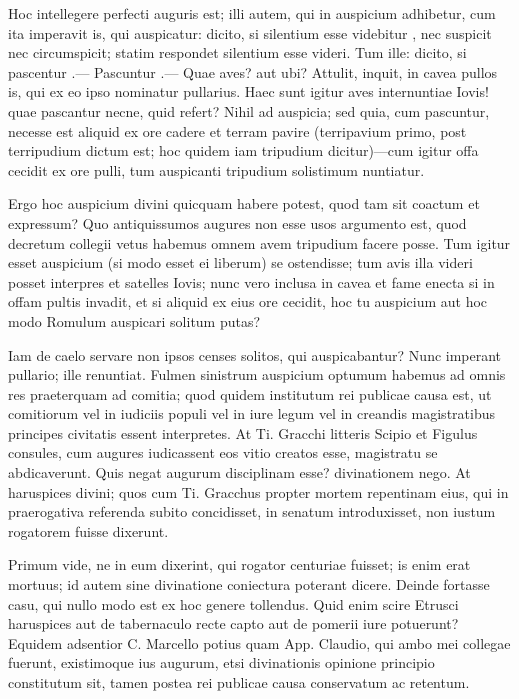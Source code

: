  Hoc intellegere perfecti auguris est; illi autem, qui in auspicium adhibetur, cum ita imperavit is, qui auspicatur: dicito, si silentium esse videbitur , nec suspicit nec circumspicit; statim respondet silentium esse videri. Tum ille: dicito, si pascentur .— Pascuntur .— Quae aves? aut ubi? Attulit, inquit, in cavea pullos is, qui ex eo ipso nominatur pullarius. Haec sunt igitur aves internuntiae Iovis! quae pascantur necne, quid refert? Nihil ad auspicia; sed quia, cum pascuntur, necesse est aliquid ex ore cadere et terram pavire (terripavium primo, post terripudium dictum est; hoc quidem iam tripudium dicitur)—cum igitur offa cecidit ex ore pulli, tum auspicanti tripudium solistimum nuntiatur.

 Ergo hoc auspicium divini quicquam habere potest, quod tam sit coactum et expressum? Quo antiquissumos augures non esse usos argumento est, quod decretum collegii vetus habemus omnem avem tripudium facere posse. Tum igitur esset auspicium (si modo esset ei liberum) se ostendisse; tum avis illa videri posset interpres et satelles Iovis; nunc vero inclusa in cavea et fame enecta si in offam pultis invadit, et si aliquid ex eius ore cecidit, hoc tu auspicium aut hoc modo Romulum auspicari solitum putas?

 Iam de caelo servare non ipsos censes solitos, qui auspicabantur? Nunc imperant pullario; ille renuntiat. Fulmen sinistrum auspicium optumum habemus ad omnis res praeterquam ad comitia; quod quidem institutum rei publicae causa est, ut comitiorum vel in iudiciis populi vel in iure legum vel in creandis magistratibus principes civitatis essent interpretes. At Ti. Gracchi litteris Scipio et Figulus consules, cum augures iudicassent eos vitio creatos esse, magistratu se abdicaverunt. Quis negat augurum disciplinam esse? divinationem nego. At haruspices divini; quos cum Ti. Gracchus propter mortem repentinam eius, qui in praerogativa referenda subito concidisset, in senatum introduxisset, non iustum rogatorem fuisse dixerunt.

 Primum vide, ne in eum dixerint, qui rogator centuriae fuisset; is enim erat mortuus; id autem sine divinatione coniectura poterant dicere. Deinde fortasse casu, qui nullo modo est ex hoc genere tollendus. Quid enim scire Etrusci haruspices aut de tabernaculo recte capto aut de pomerii iure potuerunt? Equidem adsentior C. Marcello potius quam App. Claudio, qui ambo mei collegae fuerunt, existimoque ius augurum, etsi divinationis opinione principio constitutum sit, tamen postea rei publicae causa conservatum ac retentum.

